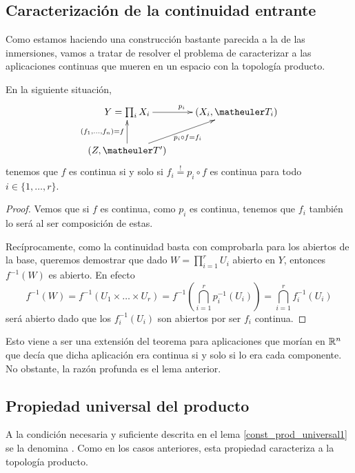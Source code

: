 \subsection{Caracterización de la continuidad entrante}
Como estamos haciendo una construcción bastante parecida a la de las inmersiones, vamos a tratar de resolver el problema de caracterizar a las aplicaciones continuas que mueren en un espacio con la topología producto.

\begin{lem}
	\label{const_prod_universal1}
	En la siguiente situación,
	\[\xymatrix{
		Y=\prod_i X_i \ar[r]^{p_i} & 
		(X_i,\T_i) \\
		(Z,\T') \ar[u]^{(f_1,\dots,f_n)=f} \ar[ru]_{p_i\circ f=f_i} &
	}\]
	tenemos que $f$ es continua si y solo si $f_i\stackrel{!}{=}p_i\circ f$ es continua para todo $i\in\{1,\dots,r\}$.
\end{lem}
\begin{proof}
	Vemos que si $f$ es continua, como $p_i$ es continua, tenemos que $f_i$ también lo será al ser composición de estas.
	
	Recíprocamente, como la continuidad basta con comprobarla para los abiertos de la base, queremos demostrar que dado $W=\prod_{i=1}^rU_i$ abierto en $Y$, entonces $f^{-1}(W)$ es abierto. En efecto
	\[f^{-1}(W)=f^{-1}(U_1\times\dots\times U_r)=f^{-1}\left(\bigcap_{i=1}^r p_i^{-1}(U_i)\right)=\bigcap_{i=1}^r f_i^{-1}(U_i)\] será abierto dado que los $f_i^{-1}(U_i)$ son abiertos por ser $f_i$ continua.
\end{proof}
\begin{obs}[Extensión]
	Esto viene a ser una extensión del teorema para aplicaciones que morían en $\mathbb{R}^n$ que decía que dicha aplicación era continua si y solo si lo era cada componente. No obstante, la razón profunda es el lema anterior.
\end{obs} 
\subsection{Propiedad universal del producto}

A la condición necesaria y suficiente descrita en el lema \ref{const_prod_universal1} se la denomina . Como en los casos anteriores, esta propiedad caracteriza a la topología producto.

